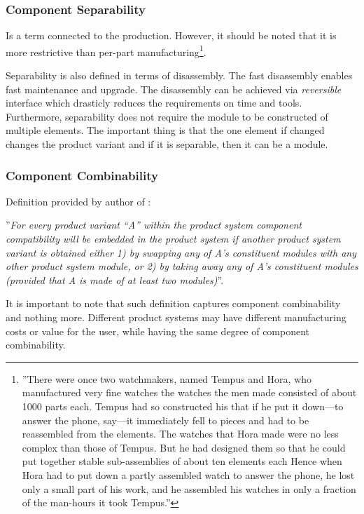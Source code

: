 \documentclass[]{scrartcl}
\begin{document}
\subsubsection{Component Separability}
Is a term connected to the production. However, it should be noted that it is more restrictive than per-part manufacturing\footnote{''There were once two watchmakers, named Tempus and Hora, who manufactured very fine watches the watches	the men made consisted of about 1000 parts each. Tempus had so constructed his that if he put it down—to answer the phone, say—it immediately fell to pieces and had to be reassembled from the elements. The watches that Hora made were no less complex than those of Tempus. But he had designed them so that he could put together stable sub-assemblies of about ten elements each Hence when Hora had to put down a partly assembled watch to answer the phone, he lost only a small part of his work, and he assembled his watches in only a fraction of the man-hours it took Tempus.''\cite{Salvador2007}}. 

Separability is also defined in terms of disassembly. The fast disassembly enables fast maintenance and upgrade. The disassembly can be achieved via \emph{reversible} interface which drasticly reduces the requirements on time and tools. Furthermore, separability does not require the module to be constructed of multiple elements. The important thing is that the one element if changed changes the product variant and if it is separable, then it can be a module.

\subsubsection{Component Combinability}

Definition provided by author of \cite{Salvador2007}:

''\emph{For every product variant “A” within the product system component compatibility will be embedded in the product system if another product system variant is obtained either 1) by swapping any of A’s constituent modules with any other product system module, or 2) by taking away any of A’s constituent modules (provided that A is made of at least two modules)}''.

It is important to note that such definition captures component combinability and nothing more. Different product systems may have different manufacturing costs or value for the user, while having the same degree of component combinability.
\end{document}
